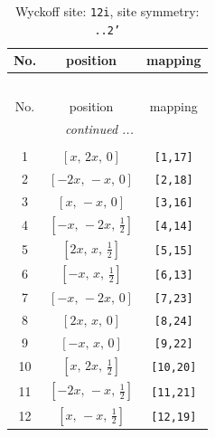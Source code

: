 \documentclass[fleqn,8pt]{jsarticle}
\begin{document}
\begin{longtable}{ccc}
\caption{Wyckoff site: {\tt 12i}, site symmetry: {\tt ..2'}}
 \\
 \hline \hline
No. & position & mapping \\ \hline \endfirsthead

\multicolumn{2}{l}{\tablename\ \thetable{}} \\
 \hline \hline
No. & position & mapping \\ \hline \endhead

 \hline \hline
\multicolumn{2}{r}{\footnotesize\it continued ...} \\ \endfoot

 \hline \hline
\multicolumn{2}{r}{} \\ \endlastfoot

1 & $\left[ x,\, 2 x,\, 0 \right]$ & {\tt [1,17]} \\ \hline
2 & $\left[ - 2 x,\, - x,\, 0 \right]$ & {\tt [2,18]} \\ \hline
3 & $\left[ x,\, - x,\, 0 \right]$ & {\tt [3,16]} \\ \hline
4 & $\left[ - x,\, - 2 x,\, \frac{1}{2} \right]$ & {\tt [4,14]} \\ \hline
5 & $\left[ 2 x,\, x,\, \frac{1}{2} \right]$ & {\tt [5,15]} \\ \hline
6 & $\left[ - x,\, x,\, \frac{1}{2} \right]$ & {\tt [6,13]} \\ \hline
7 & $\left[ - x,\, - 2 x,\, 0 \right]$ & {\tt [7,23]} \\ \hline
8 & $\left[ 2 x,\, x,\, 0 \right]$ & {\tt [8,24]} \\ \hline
9 & $\left[ - x,\, x,\, 0 \right]$ & {\tt [9,22]} \\ \hline
10 & $\left[ x,\, 2 x,\, \frac{1}{2} \right]$ & {\tt [10,20]} \\ \hline
11 & $\left[ - 2 x,\, - x,\, \frac{1}{2} \right]$ & {\tt [11,21]} \\ \hline
12 & $\left[ x,\, - x,\, \frac{1}{2} \right]$ & {\tt [12,19]} \\
\end{longtable}
\renewcommand{\arraystretch}{1.2}
\end{document}
